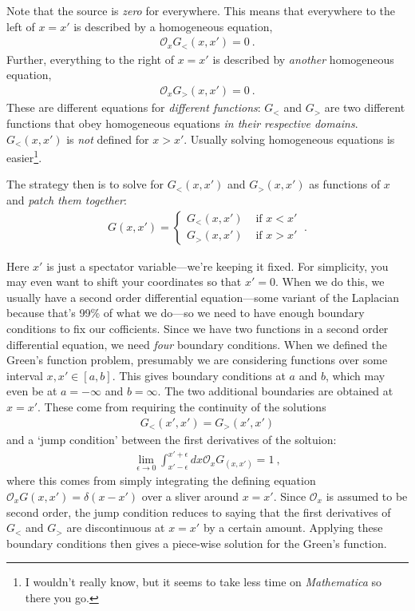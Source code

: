 \documentclass[
  11pt,
	colorful,
	raggedright,
]{tufte-style-thesis-flip}
\begin{document}
Note that the source is \emph{zero} for everywhere. This means that everywhere to the left of $x=x'$ is described by a homogeneous equation,
\begin{align}
  \mathcal O_x G_<(x,x') = 0 \ .
\end{align}
Further, everything to the right of $x=x'$ is described by \emph{another} homogeneous equation,
\begin{align}
  \mathcal O_x G_>(x,x') = 0 \ .
\end{align}
These are different equations for \emph{different functions}: $G_<$ and $G_>$ are two different functions that obey homogeneous equations \emph{in their respective domains}. $G_<(x,x')$ is \emph{not} defined for $x>x'$. Usually solving homogeneous equations is easier\footnote{I wouldn't really know, but it seems to take less time on \emph{Mathematica} so there you go.}. 

The strategy then  is to solve for $G_<(x,x')$ and $G_>(x,x')$ as functions of $x$ and \emph{patch them together}: 
\begin{align}
  G(x,x') = 
  \begin{cases}
  G_<(x,x') & \text{ if } x<x'\\
  G_>(x,x') & \text{ if } x>x'
  \end{cases}\ .
\end{align}

Here $x'$ is just a spectator variable---we're keeping it fixed. For simplicity, you may even want to shift your coordinates so that $x'=0$. When we do this, we usually have a second order differential equation---some variant of the Laplacian because that's 99\% of what we do---so we need to have enough boundary conditions to fix our cofficients. Since we have two functions in a second order differential equation, we need \emph{four} boundary conditions. When we defined the Green's function problem, presumably we are considering functions over some interval $x,x'\in [a,b]$. This gives boundary conditions at $a$ and $b$, which may even be at $a=-\infty$ and $b=\infty$. The two additional boundaries are obtained at $x=x'$. These come from requiring the continuity of the solutions
\begin{align}
  G_<(x',x') = G_>(x',x')
\end{align}
and a `jump condition' between the first derivatives of the soltuion:
\begin{align}
  \lim_{\epsilon\to 0}\int_{x'-\epsilon}^{x'+\epsilon}dx \mathcal O_x G_(x,x') = 1 \ ,
\end{align}
where this comes from simply integrating the defining equation $\mathcal O_xG(x,x') = \delta(x-x')$ over a sliver around $x=x'$. Since $\mathcal O_x$ is assumed to be second order, the jump condition reduces to saying that the first derivatives of $G_<$ and $G_>$ are discontinuous at $x=x'$ by a certain amount. Applying these boundary conditions then gives a piece-wise solution for the Green's function.
\end{document}
